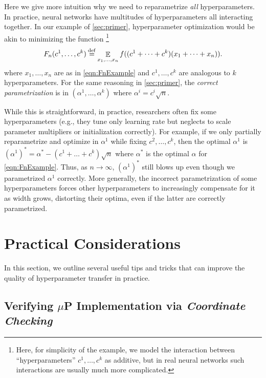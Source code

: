 \documentclass{article}
\theoremstyle{definition}
\DeclareMathOperator*{\EV}{\mathbb{E}}
\begin{document}
Here we give more intuition why we need to reparametrize \emph{all} hyperparameters.
In practice, neural networks have multitudes of hyperparameters all interacting together.
In our example of \cref{sec:primer}, hyperparameter optimization would be akin to minimizing the function%
\footnote{
Here, for simplicity of the example, we model the interaction between ``hyperparameters'' $c^1, \ldots, c^k$ as additive, but in real neural networks such interactions are usually much more complicated.
}
\[
F_{n}(c^1, \ldots, c^k)\defeq\EV_{x_{1},\ldots,x_{n}}f((c^1 + \cdots + c^k)(x_{1}+\cdots+x_{n})).
\]
where $x_1, \ldots, x_n$ are as in \cref{eqn:FnExample} and $c^1, \ldots, c^k$ are analogous to $k$ hyperparameters.
For the same reasoning in \cref{sec:primer}, the \emph{correct parametrization} is in $(\alpha^1, \ldots, \alpha^k)$ where $\alpha^i = c^i \sqrt{n}$.

While this is straightforward, in practice, researchers often fix some hyperparameters (e.g., they tune only learning rate but neglects to scale parameter multipliers or initialization correctly).
For example, if we only partially reparametrize and optimize in $\alpha^1$ while fixing $c^2, \ldots, c^k$, then the optimal $\alpha^1$ is $(\alpha^1)^* = \alpha^* - (c^1 + \ldots + c^k) \sqrt n$ where $\alpha^*$ is the optimal $\alpha$ for \cref{eqn:FnExample}.
Thus, as $n \to \infty$, $(\alpha^1)^*$ still blows up even though we parametrized $\alpha^1$ correctly.
More generally, the incorrect parametrization of some hyperparameters forces other hyperparameters to increasingly compensate for it as width grows, distorting their optima, even if the latter are correctly parametrized.

\section{Practical Considerations}
\label{sec:practical}

In this section, we outline several useful tips and tricks that can improve the quality of hyperparameter transfer in practice.

\subsection{Verifying \texorpdfstring{$\mu$P}{muP} Implementation via \emph{Coordinate Checking}}
\end{document}
